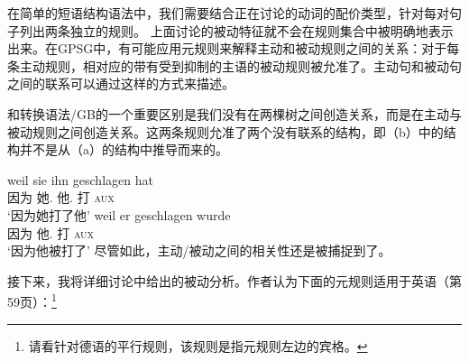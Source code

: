 \noindent
在简单的短语结构语法中，我们需要结合正在讨论的动词的配价类型，针对每对句子列出两条独立的规则。
上面讨论的被动特征就不会在规则集合中被明确地表示出来。在GPSG中，有可能应用元规则来解释主动和被动规则之间的关系：对于每条主动规则，相对应的带有受到抑制的主语的被动规则被允准了。主动句和被动句之间的联系可以通过这样的方式来描述。

和转换语法/GB\indexgbc\indexmpc 的一个重要区别是我们没有在两棵树之间创造关系，而是在主动与被动规则之间创造关系。这两条规则允准了两个没有联系的结构，即（b）中的结构并不是从（a）的结构中推导而来的。

\eal
\ex 
\gll weil sie ihn geschlagen hat\\
     因为 她.\nom{} 他.\acc{} 打 \textsc{aux}\\
\glt `因为她打了他'
\ex 
\gll weil er geschlagen wurde\\
     因为 他.\nom{} 打 \textsc{aux}\\
\glt `因为他被打了'
\zl
%
尽管如此，主动/被动之间的相关性还是被捕捉到了。

接下来，我将详细讨论中给出的被动分析。作者认为下面的元规则适用于英语（第59页）：\footnote{%
请看针对德语的平行规则，该规则是指元规则左边的宾格。
}

